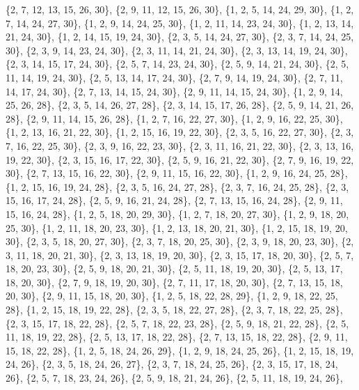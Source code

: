 \documentclass[11pt,a4paper]{article}
\begin{document}
{\{2, 7, 12, 13, 15, 26, 30\}, \{2, 9, 11, 12, 15, 26, 30\}, \{1, 2, 5, 14, 24, 29, 30\}, \{1, 2, 7, 14, 24, 27, 30\}, \{1, 2, 9, 14, 24, 25, 30\},
\{1, 2, 11, 14, 23, 24, 30\}, \{1, 2, 13, 14, 21, 24, 30\}, \{1, 2, 14, 15, 19, 24, 30\}, \{2, 3, 5, 14, 24, 27, 30\}, \{2, 3, 7, 14, 24, 25, 30\},
\{2, 3, 9, 14, 23, 24, 30\}, \{2, 3, 11, 14, 21, 24, 30\}, \{2, 3, 13, 14, 19, 24, 30\}, \{2, 3, 14, 15, 17, 24, 30\}, \{2, 5, 7, 14, 23, 24, 30\},
\{2, 5, 9, 14, 21, 24, 30\}, \{2, 5, 11, 14, 19, 24, 30\}, \{2, 5, 13, 14, 17, 24, 30\}, \{2, 7, 9, 14, 19, 24, 30\}, \{2, 7, 11, 14, 17, 24, 30\},
\{2, 7, 13, 14, 15, 24, 30\}, \{2, 9, 11, 14, 15, 24, 30\}, \{1, 2, 9, 14, 25, 26, 28\}, \{2, 3, 5, 14, 26, 27, 28\}, \{2, 3, 14, 15, 17, 26, 28\},
\{2, 5, 9, 14, 21, 26, 28\}, \{2, 9, 11, 14, 15, 26, 28\}, \{1, 2, 7, 16, 22, 27, 30\}, \{1, 2, 9, 16, 22, 25, 30\}, \{1, 2, 13, 16, 21, 22, 30\},
\{1, 2, 15, 16, 19, 22, 30\}, \{2, 3, 5, 16, 22, 27, 30\}, \{2, 3, 7, 16, 22, 25, 30\}, \{2, 3, 9, 16, 22, 23, 30\}, \{2, 3, 11, 16, 21, 22, 30\},
\{2, 3, 13, 16, 19, 22, 30\}, \{2, 3, 15, 16, 17, 22, 30\}, \{2, 5, 9, 16, 21, 22, 30\}, \{2, 7, 9, 16, 19, 22, 30\}, \{2, 7, 13, 15, 16, 22, 30\},
\{2, 9, 11, 15, 16, 22, 30\}, \{1, 2, 9, 16, 24, 25, 28\}, \{1, 2, 15, 16, 19, 24, 28\}, \{2, 3, 5, 16, 24, 27, 28\}, \{2, 3, 7, 16, 24, 25, 28\},
\{2, 3, 15, 16, 17, 24, 28\}, \{2, 5, 9, 16, 21, 24, 28\}, \{2, 7, 13, 15, 16, 24, 28\}, \{2, 9, 11, 15, 16, 24, 28\}, \{1, 2, 5, 18, 20, 29, 30\},
\{1, 2, 7, 18, 20, 27, 30\}, \{1, 2, 9, 18, 20, 25, 30\}, \{1, 2, 11, 18, 20, 23, 30\}, \{1, 2, 13, 18, 20, 21, 30\}, \{1, 2, 15, 18, 19, 20, 30\},
\{2, 3, 5, 18, 20, 27, 30\}, \{2, 3, 7, 18, 20, 25, 30\}, \{2, 3, 9, 18, 20, 23, 30\}, \{2, 3, 11, 18, 20, 21, 30\}, \{2, 3, 13, 18, 19, 20, 30\},
\{2, 3, 15, 17, 18, 20, 30\}, \{2, 5, 7, 18, 20, 23, 30\}, \{2, 5, 9, 18, 20, 21, 30\}, \{2, 5, 11, 18, 19, 20, 30\}, \{2, 5, 13, 17, 18, 20, 30\},
\{2, 7, 9, 18, 19, 20, 30\}, \{2, 7, 11, 17, 18, 20, 30\}, \{2, 7, 13, 15, 18, 20, 30\}, \{2, 9, 11, 15, 18, 20, 30\}, \{1, 2, 5, 18, 22, 28, 29\},
\{1, 2, 9, 18, 22, 25, 28\}, \{1, 2, 15, 18, 19, 22, 28\}, \{2, 3, 5, 18, 22, 27, 28\}, \{2, 3, 7, 18, 22, 25, 28\}, \{2, 3, 15, 17, 18, 22, 28\},
\{2, 5, 7, 18, 22, 23, 28\}, \{2, 5, 9, 18, 21, 22, 28\}, \{2, 5, 11, 18, 19, 22, 28\}, \{2, 5, 13, 17, 18, 22, 28\}, \{2, 7, 13, 15, 18, 22, 28\},
\{2, 9, 11, 15, 18, 22, 28\}, \{1, 2, 5, 18, 24, 26, 29\}, \{1, 2, 9, 18, 24, 25, 26\}, \{1, 2, 15, 18, 19, 24, 26\}, \{2, 3, 5, 18, 24, 26, 27\},
\{2, 3, 7, 18, 24, 25, 26\}, \{2, 3, 15, 17, 18, 24, 26\}, \{2, 5, 7, 18, 23, 24, 26\}, \{2, 5, 9, 18, 21, 24, 26\}, \{2, 5, 11, 18, 19, 24, 26\},
}
\end{document}
